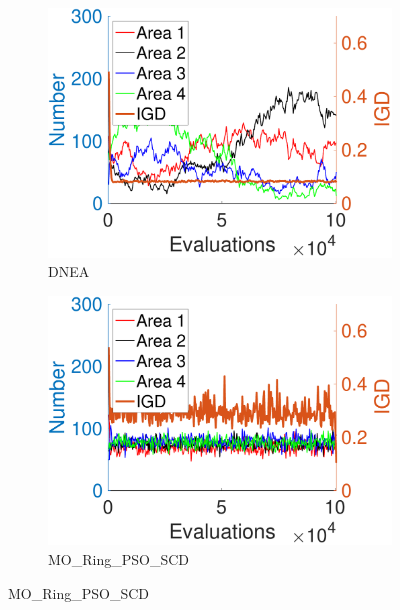 \documentclass[conference]{IEEEtran}
\begin{document}
\begin{figure}[htbp]
    \centering
    \begin{subfigure}[b]{.24\textwidth}
    \includegraphics[width=\linewidth]{Section5/dim2/Diversity/DNEA}
    \caption{DNEA}
    \end{subfigure}
    \begin{subfigure}[b]{.24\textwidth}
    \includegraphics[width=\linewidth]{Section5/dim2/Diversity/MO_Ring_PSO_SCD}
    \caption{MO\_Ring\_PSO\_SCD}
    \end{subfigure}
    

\end{figure}
\end{document}
